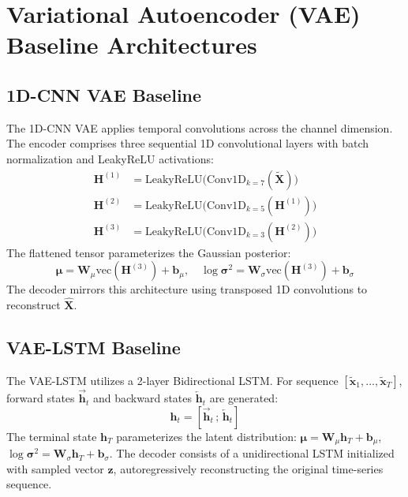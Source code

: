 \documentclass[12pt,a4paper]{report}
\begin{document}
\section{Variational Autoencoder (VAE) Baseline Architectures}

\subsection{1D-CNN VAE Baseline}
The 1D-CNN VAE applies temporal convolutions across the channel dimension. The encoder comprises three sequential 1D convolutional layers with batch normalization and LeakyReLU activations:
\begin{align}
    \mathbf{H}^{(1)} &= \text{LeakyReLU}\big(\text{Conv1D}_{k=7}(\tilde{\mathbf{X}})\big) \\
    \mathbf{H}^{(2)} &= \text{LeakyReLU}\big(\text{Conv1D}_{k=5}(\mathbf{H}^{(1)})\big) \\
    \mathbf{H}^{(3)} &= \text{LeakyReLU}\big(\text{Conv1D}_{k=3}(\mathbf{H}^{(2)})\big)
\end{align}
The flattened tensor parameterizes the Gaussian posterior:
\begin{equation}
    \boldsymbol{\mu} = \mathbf{W}_\mu \text{vec}(\mathbf{H}^{(3)}) + \mathbf{b}_\mu, \quad \log \boldsymbol{\sigma}^2 = \mathbf{W}_\sigma \text{vec}(\mathbf{H}^{(3)}) + \mathbf{b}_\sigma
\end{equation}
The decoder mirrors this architecture using transposed 1D convolutions to reconstruct $\hat{\mathbf{X}}$.

\subsection{VAE-LSTM Baseline}
The VAE-LSTM utilizes a 2-layer Bidirectional LSTM. For sequence $[\tilde{\mathbf{x}}_1, \dots, \tilde{\mathbf{x}}_T]$, forward states $\vec{\mathbf{h}}_t$ and backward states $\overleftarrow{\mathbf{h}}_t$ are generated:
\begin{equation}
    \mathbf{h}_t = [\vec{\mathbf{h}}_t \,;\, \overleftarrow{\mathbf{h}}_t]
\end{equation}
The terminal state $\mathbf{h}_T$ parameterizes the latent distribution: $\boldsymbol{\mu} = \mathbf{W}_\mu \mathbf{h}_T + \mathbf{b}_\mu$, $\log \boldsymbol{\sigma}^2 = \mathbf{W}_\sigma \mathbf{h}_T + \mathbf{b}_\sigma$. The decoder consists of a unidirectional LSTM initialized with sampled vector $\mathbf{z}$, autoregressively reconstructing the original time-series sequence.
\end{document}
